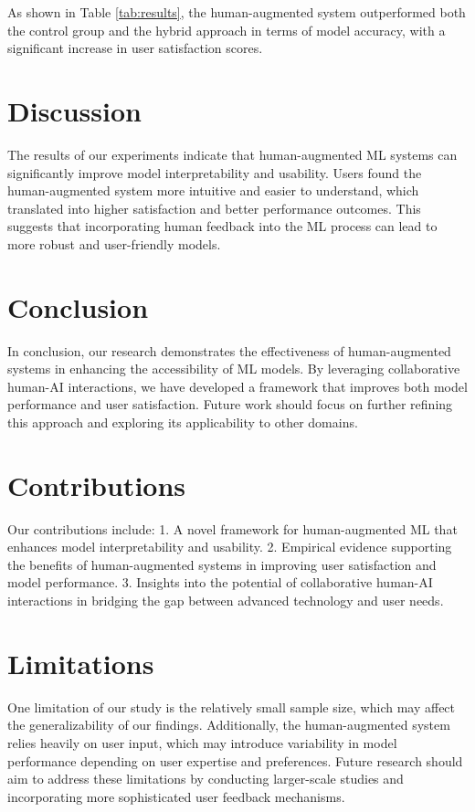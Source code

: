 As shown in Table \ref{tab:results}, the human-augmented system outperformed both the control group and the hybrid approach in terms of model accuracy, with a significant increase in user satisfaction scores.

\section{Discussion}
The results of our experiments indicate that human-augmented ML systems can significantly improve model interpretability and usability. Users found the human-augmented system more intuitive and easier to understand, which translated into higher satisfaction and better performance outcomes. This suggests that incorporating human feedback into the ML process can lead to more robust and user-friendly models.

\section{Conclusion}
In conclusion, our research demonstrates the effectiveness of human-augmented systems in enhancing the accessibility of ML models. By leveraging collaborative human-AI interactions, we have developed a framework that improves both model performance and user satisfaction. Future work should focus on further refining this approach and exploring its applicability to other domains.

\section{Contributions}
Our contributions include:
1. A novel framework for human-augmented ML that enhances model interpretability and usability.
2. Empirical evidence supporting the benefits of human-augmented systems in improving user satisfaction and model performance.
3. Insights into the potential of collaborative human-AI interactions in bridging the gap between advanced technology and user needs.

\section{Limitations}
One limitation of our study is the relatively small sample size, which may affect the generalizability of our findings. Additionally, the human-augmented system relies heavily on user input, which may introduce variability in model performance depending on user expertise and preferences. Future research should aim to address these limitations by conducting larger-scale studies and incorporating more sophisticated user feedback mechanisms.

